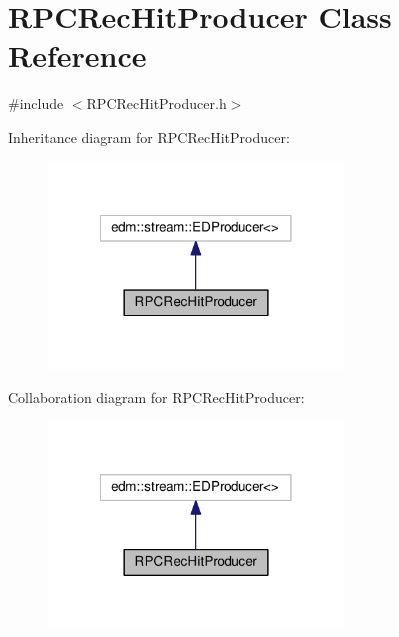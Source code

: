 \hypertarget{classRPCRecHitProducer}{\section{R\-P\-C\-Rec\-Hit\-Producer Class Reference}
\label{classRPCRecHitProducer}
}


{\ttfamily \#include $<$R\-P\-C\-Rec\-Hit\-Producer.\-h$>$}



Inheritance diagram for R\-P\-C\-Rec\-Hit\-Producer\-:\nopagebreak
\begin{figure}[H]
\begin{center}
\leavevmode
\includegraphics[width=222pt]{classRPCRecHitProducer__inherit__graph}
\end{center}
\end{figure}


Collaboration diagram for R\-P\-C\-Rec\-Hit\-Producer\-:\nopagebreak
\begin{figure}[H]
\begin{center}
\leavevmode
\includegraphics[width=222pt]{classRPCRecHitProducer__coll__graph}
\end{center}
\end{figure}
